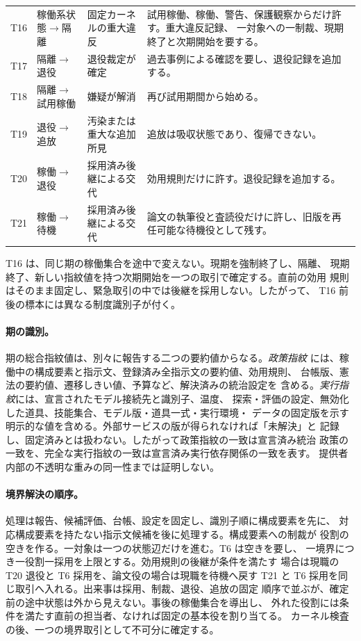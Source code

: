\begin{longtable}{@{}p{}p{}p{}p{}@{}}
  T16 & 稼働系状態$\rightarrow$隔離 & 固定カーネルの重大違反 &
    試用稼働、稼働、警告、保護観察からだけ許す。重大違反記録、
    一対象への一制裁、現期終了と次期開始を要する。\\
  T17 & 隔離$\rightarrow$退役 & 退役裁定が確定 &
    過去事例による確認を要し、退役記録を追加する。\\
  T18 & 隔離$\rightarrow$試用稼働 & 嫌疑が解消 &
    再び試用期間から始める。\\
  T19 & 退役$\rightarrow$追放 & 汚染または重大な追加所見 &
    追放は吸収状態であり、復帰できない。\\
  T20 & 稼働$\rightarrow$退役 & 採用済み後継による交代 &
    効用規則だけに許す。退役記録を追加する。\\
  T21 & 稼働$\rightarrow$待機 & 採用済み後継による交代 &
    論文の執筆役と査読役だけに許し、旧版を再任可能な待機役として残す。\\
  \bottomrule
\end{longtable}
\normalsize

T16 は、同じ期の稼働集合を途中で変えない。現期を強制終了し、隔離、
現期終了、新しい指紋値を持つ次期開始を一つの取引で確定する。直前の効用
規則はそのまま固定し、緊急取引の中では後継を採用しない。したがって、
T16 前後の標本には異なる制度識別子が付く。

\paragraph{期の識別。}
期の総合指紋値は、別々に報告する二つの要約値からなる。\emph{政策指紋}
には、稼働中の構成要素と指示文、登録済み全指示文の要約値、効用規則、
台帳版、憲法の要約値、遷移しきい値、予算など、解決済みの統治設定を
含める。\emph{実行指紋}には、宣言されたモデル接続先と識別子、温度、
探索・評価の設定、無効化した道具、技能集合、モデル版・道具一式・実行環境・
データの固定版を示す明示的な値を含める。外部サービスの版が得られなければ「未解決」と
記録し、固定済みとは扱わない。したがって政策指紋の一致は宣言済み統治
政策の一致を、完全な実行指紋の一致は宣言済み実行依存関係の一致を表す。
提供者内部の不透明な重みの同一性までは証明しない。

\paragraph{境界解決の順序。}
処理は報告、候補評価、台帳、設定を固定し、識別子順に構成要素を先に、
対応構成要素を持たない指示文候補を後に処理する。構成要素への制裁が
役割の空きを作る。一対象は一つの状態辺だけを進む。T6 は空きを要し、
一境界につき一役割一採用を上限とする。効用規則の後継が条件を満たす
場合は現職の T20 退役と T6 採用を、論文役の場合は現職を待機へ戻す T21
と T6 採用を同じ取引へ入れる。出来事は採用、制裁、退役、追放の固定
順序で並ぶが、確定前の途中状態は外から見えない。事後の稼働集合を導出し、
外れた役割には条件を満たす直前の担当者、なければ固定の基本役を割り当てる。
カーネル検査の後、一つの境界取引として不可分に確定する。

